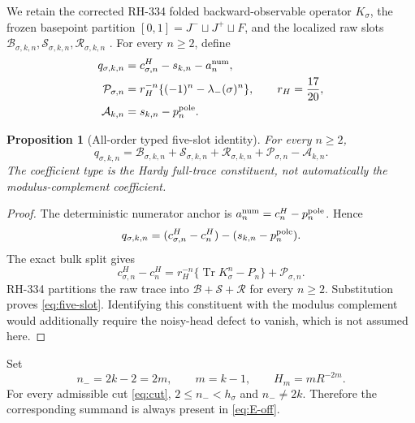 \documentclass[11pt]{article}
\newtheorem{proposition}[theorem]{Proposition}
\theoremstyle{remark}
\newcommand{\Tr}{\operatorname{Tr}}
\newcommand{\cA}{\mathcal A}
\newcommand{\cB}{\mathcal B}
\newcommand{\cP}{\mathcal P}
\newcommand{\cR}{\mathcal R}
\newcommand{\cS}{\mathcal S}
\begin{document}
We retain the corrected RH-334 folded backward-observable operator
$K_\sigma$, the frozen basepoint partition
$[0,1]=J^-\sqcup J^+\sqcup F$, and the localized raw slots
$\cB_{\sigma,k,n},\cS_{\sigma,k,n},\cR_{\sigma,k,n}$
\citep{WangObservation2026}.  For every $n\ge2$, define
\begin{align}
 q_{\sigma,k,n}
 &=c^H_{\sigma,n}-s_{k,n}-a_n^{\rm num},
 \label{eq:q-definition}\\
 \cP_{\sigma,n}
 &=r_H^{-n}\{(-1)^n-\lambda_-(\sigma)^n\},
 \qquad r_H=\frac{17}{20},
 \label{eq:parity}\\
 \cA_{k,n}&=s_{k,n}-p_n^{\rm pole}.
 \label{eq:counterloop-defect}
\end{align}

\begin{proposition}[All-order typed five-slot identity]
\label{prop:five-slot}
For every $n\ge2$,
\begin{equation}\label{eq:five-slot}
 \boxed{
 q_{\sigma,k,n}
 =\cB_{\sigma,k,n}+\cS_{\sigma,k,n}+\cR_{\sigma,k,n}
  +\cP_{\sigma,n}-\cA_{k,n}.}
\end{equation}
The coefficient type is the Hardy full-trace constituent, not automatically
the modulus-complement coefficient.
\end{proposition}

\begin{proof}
The deterministic numerator anchor is
$a_n^{\rm num}=c^H_n-p_n^{\rm pole}$.  Hence
\begin{equation*}
 q_{\sigma,k,n}
 =(c^H_{\sigma,n}-c^H_n)-(s_{k,n}-p_n^{\rm pole}).
\end{equation*}
The exact bulk split gives
\begin{equation*}
 c^H_{\sigma,n}-c^H_n
 =r_H^{-n}\{\Tr K_\sigma^n-P_n\}+\cP_{\sigma,n}.
\end{equation*}
RH-334 partitions the raw trace into $\cB+\cS+\cR$ for every $n\ge2$.
Substitution proves \eqref{eq:five-slot}.  Identifying this constituent with
the modulus complement would additionally require the noisy-head defect to
vanish, which is not assumed here.
\end{proof}

Set
\begin{equation}\label{eq:n-minus}
 n_-=2k-2=2m,
 \qquad m=k-1,
 \qquad H_m=mR^{-2m}.
\end{equation}
For every admissible cut \eqref{eq:cut}, $2\le n_-<h_\sigma$ and
$n_-\ne2k$.  Therefore the corresponding summand is always present in
\eqref{eq:E-off}.
\end{document}
